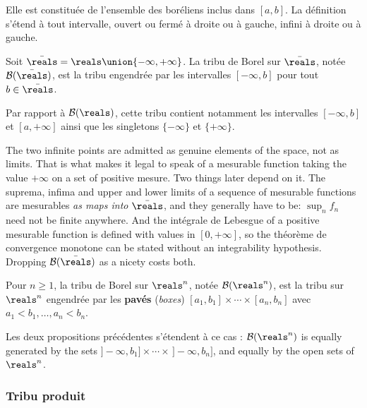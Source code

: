 Elle est constituée de l'ensemble des boréliens inclus dans $[a,b]$. La définition
s'étend à tout intervalle, ouvert ou fermé à droite ou à gauche, infini à droite ou
à gauche.

\begin{definition}
  Soit $\bar{\reals} = \reals \union \{-\infty,+\infty\}$. La tribu de Borel sur
  $\bar{\reals}$, notée $\mathcal{B}(\bar{\reals})$, est la tribu engendrée par les
  intervalles $[-\infty,b]$ pour tout $b \in \bar{\reals}$.
\end{definition}

Par rapport à $\mathcal{B}(\reals)$, cette tribu contient notamment les intervalles
$[-\infty,b]$ et $[a,+\infty]$ ainsi que les singletons $\{-\infty\}$ et
$\{+\infty\}$.

\begin{remark}
  The two infinite points are admitted as genuine elements of the space, not as
  limits. That is what makes it legal to speak of a mesurable function taking the
  value $+\infty$ on a set of positive mesure. Two things later depend on it. The
  suprema, infima and upper and lower limits of a sequence of mesurable functions
  are mesurables \emph{as maps into $\bar{\reals}$}, and they generally have to be:
  $\sup_{n} f_{n}$ need not be finite anywhere. And the intégrale de Lebesgue of a
  positive mesurable function is defined with values in $[0,+\infty]$, so the
  théorème de convergence monotone can be stated without an integrability
  hypothesis. Dropping $\mathcal{B}(\bar{\reals})$ as a nicety costs both.
\end{remark}

\begin{definition}
  Pour $n \geq 1$, la tribu de Borel sur $\reals^{n}$, notée
  $\mathcal{B}(\reals^{n})$, est la tribu sur $\reals^{n}$ engendrée par les
  \textbf{pavés} (\textit{boxes}) $[a_{1},b_{1}] \times \cdots \times [a_{n},b_{n}]$
  avec $a_{1} < b_{1}, \ldots, a_{n} < b_{n}$.
\end{definition}

Les deux propositions précédentes s'étendent à ce cas : $\mathcal{B}(\reals^{n})$
is equally generated by the sets $]-\infty,b_{1}] \times \cdots \times
\,]-\infty,b_{n}]$, and equally by the open sets of $\reals^{n}$.

\subsubsection{Tribu produit}

